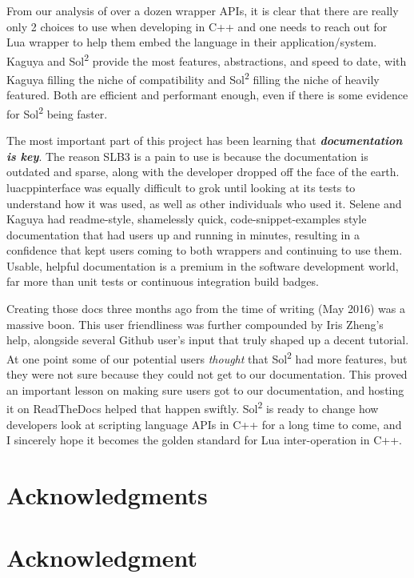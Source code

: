 \documentclass[conference,compsoc]{IEEEtran}
\newcommand{\soltwo}{Sol\textsuperscript{2}}
\begin{document}
From our analysis of over a dozen wrapper APIs, it is clear that there are really only 2 choices to use when developing in C++ and one needs to reach out for Lua wrapper to help them embed the language in their application/system. Kaguya and \soltwo{} provide the most features, abstractions, and speed to date, with Kaguya filling the niche of compatibility and \soltwo{} filling the niche of heavily featured. Both are efficient and performant enough, even if there is some evidence for \soltwo{} being faster.

The most important part of this project has been learning that \emph{\textbf{documentation is key}}. The reason SLB3 is a pain to use is because the documentation is outdated and sparse, along with the developer dropped off the face of the earth. luacppinterface was equally difficult to grok until looking at its tests to understand how it was used, as well as other individuals who used it. Selene and Kaguya had readme-style, shamelessly quick, code-snippet-examples style documentation that had users up and running in minutes, resulting in a confidence that kept users coming to both wrappers and continuing to use them. Usable, helpful documentation is a premium in the software development world, far more than unit tests or continuous integration build badges.

Creating those docs three months ago from the time of writing (May 2016) was a massive boon. This user friendliness was further compounded by Iris Zheng's help, alongside several Github user's input that truly shaped up a decent tutorial. At one point some of our potential users \emph{thought} that \soltwo{} had more features, but they were not sure because they could not get to our documentation. This proved an important lesson on making sure users got to our documentation, and hosting it on ReadTheDocs helped that happen swiftly. \soltwo{} is ready to change how developers look at scripting language APIs in C++ for a long time to come, and I sincerely hope it becomes the golden standard for Lua inter-operation in C++.

\ifCLASSOPTIONcompsoc
  \section*{Acknowledgments}
\else
  \section*{Acknowledgment}
\fi
\end{document}
